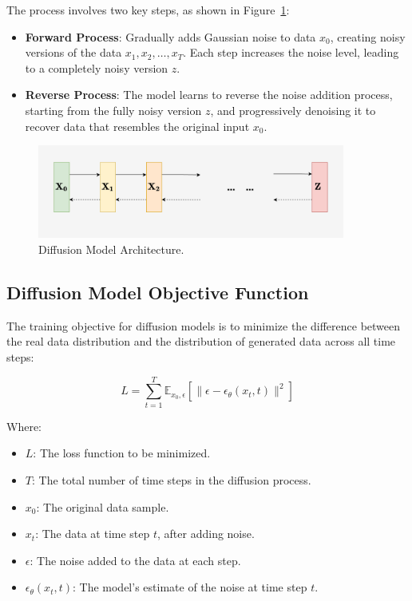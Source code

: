 The process involves two key steps, as shown in Figure~\ref{fig:Diffusion_structure}:
\begin{itemize}
  \item \textbf{Forward Process}: Gradually adds Gaussian noise to data \(x_0\), creating noisy versions of the data \(x_1, x_2, \dots, x_T\). Each step increases the noise level, leading to a completely noisy version \(z\).
  \item \textbf{Reverse Process}: The model learns to reverse the noise addition process, starting from the fully noisy version \(z\), and progressively denoising it to recover data that resembles the original input \(x_0\).
\end{itemize}

\begin{figure}[H]
    \centering
    \includegraphics[width=0.9\textwidth]{./Images/Diffusion_structure.jpg}
    \caption{Diffusion Model Architecture.}
    \label{fig:Diffusion_structure}
\end{figure}

\subsection{Diffusion Model Objective Function}

The training objective for diffusion models is to minimize the difference between the real data distribution and the distribution of generated data across all time steps:

\begin{equation}
L = \sum_{t=1}^{T} \mathbb{E}_{x_0, \epsilon} \left[ \|\epsilon - \epsilon_\theta(x_t, t)\|^2 \right]
\end{equation}

Where:
\begin{itemize}
    \item \(L\): The loss function to be minimized.
    \item \(T\): The total number of time steps in the diffusion process.
    \item \(x_0\): The original data sample.
    \item \(x_t\): The data at time step \(t\), after adding noise.
    \item \(\epsilon\): The noise added to the data at each step.
    \item \(\epsilon_\theta(x_t, t)\): The model's estimate of the noise at time step \(t\).
\end{itemize}

